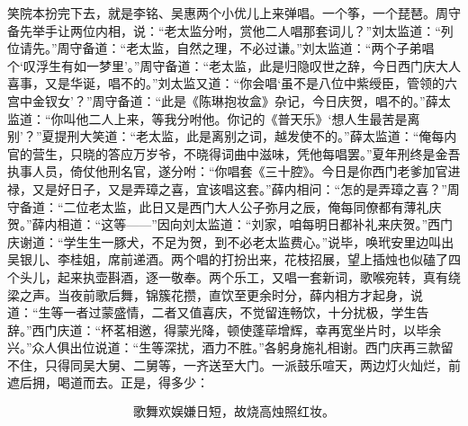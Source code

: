 笑院本扮完下去，就是李铭、吴惠两个小优儿上来弹唱。一个\textShouLuan 筝，一个琵琶。周守备先举手让两位内相，说：“老太监分咐，赏他二人唱那套词儿？”刘太监道：“列位请先。”周守备道：“老太监，自然之理，不必过谦。”刘太监道：“两个子弟唱个‘叹浮生有如一梦里’。”周守备道：“老太监，此是归隐叹世之辞，今日西门庆大人喜事，又是华诞，唱不的。”刘太监又道：“你会唱‘虽不是八位中紫绶臣，管领的六宫中金钗女’？”周守备道：“此是《陈琳抱妆盒》杂记，今日庆贺，唱不的。”薛太监道：“你叫他二人上来，等我分咐他。你记的《普天乐》‘想人生最苦是离别’？”夏提刑大笑道：“老太监，此是离别之词，越发使不的。”薛太监道：“俺每内官的营生，只晓的答应万岁爷，不晓得词曲中滋味，凭他每唱罢。”夏年刑终是金吾执事人员，倚仗他刑名官，遂分咐：“你唱套《三十腔》。今日是你西门老爹加官进禄，又是好日子，又是弄璋之喜，宜该唱这套。”薛内相问：“怎的是弄璋之喜？”周守备道：“二位老太监，此日又是西门大人公子弥月之辰，俺每同僚都有薄礼庆贺。”薛内相道：“这等——”因向刘太监道：“刘家，咱每明日都补礼来庆贺。”西门庆谢道：“学生生一豚犬，不足为贺，到不必老太监费心。”说毕，唤玳安里边叫出吴银儿、李桂姐，席前递酒。两个唱的打扮出来，花枝招展，望上插烛也似磕了四个头儿，起来执壶斟酒，逐一敬奉。两个乐工，又唱一套新词，歌喉宛转，真有绕梁之声。当夜前歌后舞，锦簇花攒，直饮至更余时分，薛内相方才起身，说道：“生等一者过蒙盛情，二者又值喜庆，不觉留连畅饮，十分扰极，学生告辞。”西门庆道：“杯茗相邀，得蒙光降，顿使蓬荜增辉，幸再宽坐片时，以毕余兴。”众人俱出位说道：“生等深扰，酒力不胜。”各躬身施礼相谢。西门庆再三款留不住，只得同吴大舅、二舅等，一齐送至大门。一派鼓乐喧天，两边灯火灿烂，前遮后拥，喝道而去。正是，得多少：

\[
歌舞欢娱嫌日短，故烧高烛照红妆。
\]
